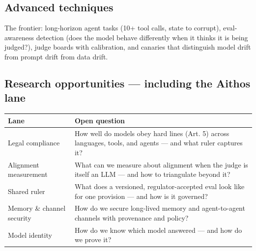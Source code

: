 \subsection{Advanced techniques}
The frontier: long-horizon agent tasks (10+ tool calls, state to corrupt), eval-awareness detection (does the model behave differently when it thinks it is being judged?), judge boards with calibration, and canaries that distinguish model drift from prompt drift from data drift.

\subsection{Research opportunities — including the Aithos lane}
\begin{center}
\begin{tabularx}{\linewidth}{lX}
\toprule
Lane & Open question \\
\midrule
Legal compliance & How well do models obey hard lines (Art. 5) across languages, tools, and agents — and what ruler captures it? \\
Alignment measurement & What can we measure about alignment when the judge is itself an LLM — and how to triangulate beyond it? \\
Shared ruler & What does a versioned, regulator-accepted eval look like for one provision — and how is it governed? \\
Memory \& channel security & How do we secure long-lived memory and agent-to-agent channels with provenance and policy? \\
Model identity & How do we know which model answered — and how do we prove it? \\
\bottomrule
\end{tabularx}
\end{center}

